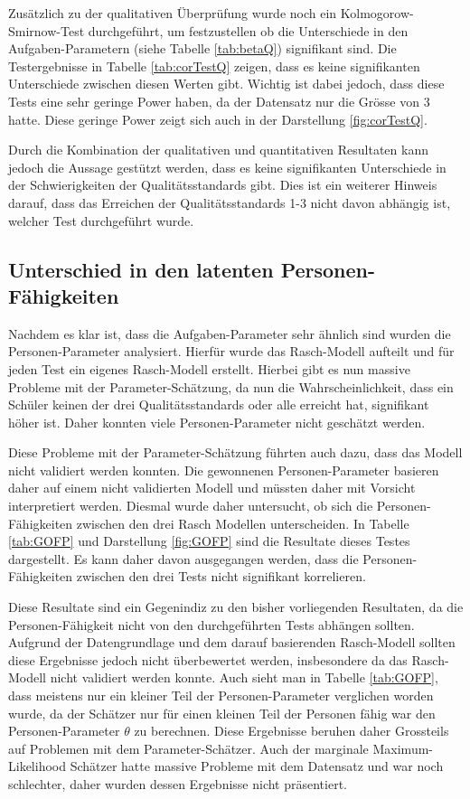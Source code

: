 Zusätzlich zu der qualitativen Überprüfung wurde noch ein Kolmogorow-Smirnow-Test durchgeführt, um festzustellen ob die Unterschiede in den Aufgaben-Parametern (siehe Tabelle \ref{tab:betaQ}) signifikant sind. Die Testergebnisse in Tabelle \ref{tab:corTestQ} zeigen, dass es keine signifikanten Unterschiede zwischen diesen Werten gibt. Wichtig ist dabei jedoch, dass diese Tests eine sehr geringe Power haben, da der Datensatz nur die Grösse von 3 hatte. Diese geringe Power zeigt sich auch in der Darstellung \ref{fig:corTestQ}.


Durch die Kombination der qualitativen und quantitativen Resultaten kann jedoch die Aussage gestützt werden, dass es keine signifikanten Unterschiede in der Schwierigkeiten der Qualitätsstandards gibt. Dies ist ein weiterer Hinweis darauf, dass das Erreichen der Qualitätsstandards 1-3 nicht davon abhängig ist, welcher Test durchgeführt wurde. 

\subsection{Unterschied in den latenten Personen-Fähigkeiten}

Nachdem es klar ist, dass die Aufgaben-Parameter sehr ähnlich sind wurden die Personen-Parameter analysiert. Hierfür wurde das Rasch-Modell aufteilt und für jeden Test ein eigenes Rasch-Modell erstellt. Hierbei gibt es nun massive Probleme mit der Parameter-Schätzung, da nun die Wahrscheinlichkeit, dass ein Schüler keinen der drei Qualitätsstandards oder alle erreicht hat, signifikant höher ist. Daher konnten viele Personen-Parameter nicht geschätzt werden.

Diese Probleme mit der Parameter-Schätzung führten auch dazu, dass das Modell nicht validiert werden konnten. Die gewonnenen Personen-Parameter basieren daher auf einem nicht validierten Modell und müssten daher mit Vorsicht interpretiert werden. Diesmal wurde daher untersucht, ob sich die Personen-Fähigkeiten zwischen den drei Rasch Modellen unterscheiden. In Tabelle \ref{tab:GOFP} und Darstellung \ref{fig:GOFP} sind die Resultate dieses Testes dargestellt. Es kann daher davon ausgegangen werden, dass die Personen-Fähigkeiten zwischen den drei Tests nicht signifikant korrelieren.

Diese Resultate sind ein Gegenindiz zu den bisher vorliegenden Resultaten, da die Personen-Fähigkeit nicht von den durchgeführten Tests abhängen sollten. Aufgrund der Datengrundlage und dem darauf basierenden Rasch-Modell sollten diese Ergebnisse jedoch nicht überbewertet werden, insbesondere da das Rasch-Modell nicht validiert werden konnte. Auch sieht man in Tabelle \ref{tab:GOFP}, dass meistens nur ein kleiner Teil der Personen-Parameter verglichen worden wurde, da der Schätzer nur für einen kleinen Teil der Personen fähig war den Personen-Parameter $\theta$ zu berechnen. Diese Ergebnisse beruhen daher Grossteils auf Problemen mit dem Parameter-Schätzer. Auch der marginale Maximum-Likelihood Schätzer hatte massive Probleme mit dem Datensatz und war noch schlechter, daher wurden dessen Ergebnisse nicht präsentiert.

